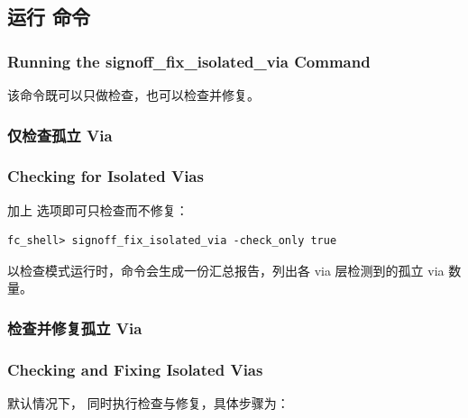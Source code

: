 \subsection{运行  命令}
\subsubsection*{Running the signoff\_fix\_isolated\_via Command}

该命令既可以只做检查，也可以检查并修复。

\subsubsection{仅检查孤立 Via}
\subsubsection*{Checking for Isolated Vias}

加上  选项即可只检查而不修复：

\begin{lstlisting}
fc_shell> signoff_fix_isolated_via -check_only true
\end{lstlisting}

以检查模式运行时，命令会生成一份汇总报告，列出各 via 层检测到的孤立 via 数量。

\subsubsection{检查并修复孤立 Via}
\subsubsection*{Checking and Fixing Isolated Vias}

默认情况下， 同时执行检查与修复，具体步骤为：

